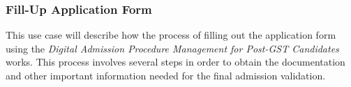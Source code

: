 \subsubsection{Fill-Up Application Form}

This use case will describe how the process of filling out the application form using the \textit{Digital Admission Procedure Management for Post-GST Candidates} works. This process involves several steps in order to obtain the documentation and other important information needed for the final admission validation.



\begin{table}[H] %
    \centering
    \small
    \renewcommand{\arraystretch}{1.4}
    \caption{Use Case Table: Fill-Up Application Form (UC-1.6)}
    \label{tab:use_case_fillup_form}
    

\end{table}
